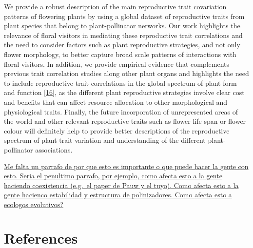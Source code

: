 \documentclass[
  12pt,
  a4paper,
]{article}
\begin{document}
We provide a robust description of the main reproductive trait covariation patterns of flowering plants by using a global dataset of reproductive traits from plant species that belong to plant-pollinator networks. Our work highlights the relevance of floral visitors in mediating these reproductive trait correlations and the need to consider factors such as plant reproductive strategies, and not only flower morphology, to better capture broad scale patterns of interactions with floral visitors. In addition, we provide empirical evidence that complements previous trait correlation studies along other plant organs and highlights the need to include reproductive trait correlations in the global spectrum of plant form and function {[}\protect\hyperlink{ref-diaz2016}{16}{]}, as the different plant reproductive strategies involve clear cost and benefits that can affect resource allocation to other morphological and physiological traits. Finally, the future incorporation of unrepresented areas of the world and other relevant reproductive traits such as flower life span or flower colour will definitely help to provide better descriptions of the reproductive spectrum of plant trait variation and understanding of the different plant-pollinator associations.

\href{}{Me falta un parrafo de por que esto es importante o que puede hacer la gente con esto. Seria el penultimo parrafo, por ejemplo, como afecta esto a la gente haciendo coexistencia (e.g.~el paper de Pauw y el tuyo). Como afecta esto a la gente hacienco estabilidad y estructura de polinizadores. Como afecta esto a ecologos evolutivos?}

\hypertarget{references}{%
\section{References}\label{references}}
\end{document}
